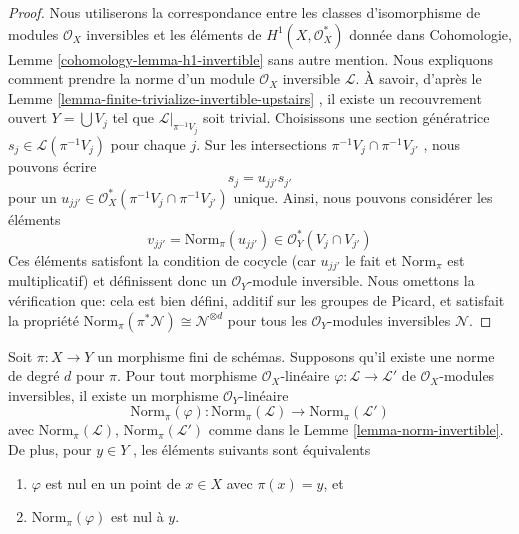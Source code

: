 \begin{proof}
Nous utiliserons la correspondance entre les classes d'isomorphisme de modules
 $\mathcal{O}_X$ inversibles et les éléments de  $H^1(X, \mathcal{O}_X^*)$  donnée dans Cohomologie,
Lemme  \ref{cohomology-lemma-h1-invertible}  sans autre mention. Nous expliquons comment prendre la norme
d'un module  $\mathcal{O}_X$ inversible  $\mathcal{L}$. À savoir, d'après le Lemme
 \ref{lemma-finite-trivialize-invertible-upstairs} , il existe un recouvrement ouvert  $Y = \bigcup V_j$  tel que  $\mathcal{L}|_{\pi^{-1}V_j}$ 
soit trivial. Choisissons une section génératrice  $s_j \in \mathcal{L}(\pi^{-1}V_j)$  pour chaque
 $j$. Sur les intersections  $\pi^{-1}V_j \cap \pi^{-1}V_{j'}$ , nous pouvons écrire
$$
s_j = u_{jj'} s_{j'}
$$
pour un  $u_{jj'} \in \mathcal{O}^*_X(\pi^{-1}V_j \cap \pi^{-1}V_{j'})$ unique. Ainsi, nous pouvons considérer les éléments
$$
v_{jj'} = \text{Norm}_\pi(u_{jj'}) \in \mathcal{O}_Y^*(V_j \cap V_{j'})
$$
Ces éléments satisfont la condition de cocycle (car  $u_{jj'}$  le fait et
 $\text{Norm}_\pi$  est multiplicatif) et définissent donc un  $\mathcal{O}_Y$-module
inversible. Nous omettons la vérification que: cela est bien défini, additif sur
les groupes de Picard, et satisfait la propriété  $\text{Norm}_\pi(\pi^*\mathcal{N}) \cong \mathcal{N}^{\otimes d}$  pour tous les
 $\mathcal{O}_Y$-modules inversibles  $\mathcal{N}$.
\end{proof}

\begin{lemma}
\label{lemma-norm-map-invertible}
Soit  $\pi : X \to Y$  un morphisme fini de schémas. Supposons qu'il existe une norme
de degré  $d$  pour  $\pi$. Pour tout morphisme  $\mathcal{O}_X$-linéaire
 $\varphi : \mathcal{L} \to \mathcal{L}'$  de  $\mathcal{O}_X$-modules inversibles, il existe un
morphisme  $\mathcal{O}_Y$-linéaire
$$
\text{Norm}_\pi(\varphi) :
\text{Norm}_\pi(\mathcal{L})
\longrightarrow
\text{Norm}_\pi(\mathcal{L}')
$$
avec  $\text{Norm}_\pi(\mathcal{L})$,  $\text{Norm}_\pi(\mathcal{L}')$  comme dans le Lemme  \ref{lemma-norm-invertible}. De plus, pour
 $y \in Y$ , les éléments suivants sont équivalents
\begin{enumerate}
\item $\varphi$  est nul en un point de  $x \in X$  avec  $\pi(x) = y$, et
\item $\text{Norm}_\pi(\varphi)$  est nul à  $y$.
\end{enumerate}
\end{lemma}


